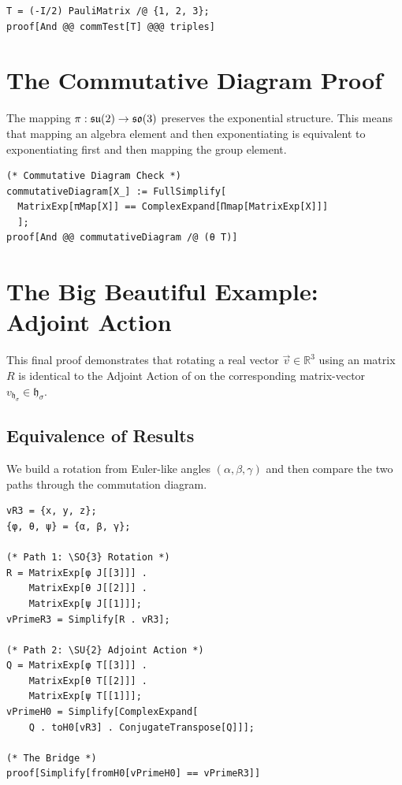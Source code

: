 \begin{Verbatim}[frame=single, label=Mathematica]
T = (-I/2) PauliMatrix /@ {1, 2, 3};
proof[And @@ commTest[T] @@@ triples] 
\end{Verbatim}

\section{The Commutative Diagram Proof}
The mapping $\pi: \mathfrak{su}(2) \to \mathfrak{so}(3)$ preserves the
exponential structure. This means that mapping an algebra element and then
exponentiating is equivalent to exponentiating first and then mapping the group
element.

\begin{Verbatim}[frame=single, label=Mathematica]
(* Commutative Diagram Check *)
commutativeDiagram[X_] := FullSimplify[
  MatrixExp[πMap[X]] == ComplexExpand[Πmap[MatrixExp[X]]]
  ];
proof[And @@ commutativeDiagram /@ (θ T)] 
\end{Verbatim}

\section{The Big Beautiful Example: Adjoint Action}
This final proof demonstrates that rotating a real vector $\vec{v} \in
\mathbb{R}^3$ using an  matrix $R$ is identical to the Adjoint Action of
 on the corresponding matrix-vector $v_{\mathfrak{h}_\sigma} \in
\mathfrak{h}_\sigma$.

\subsection{Equivalence of Results}
We build a rotation from Euler-like angles $(\alpha, \beta, \gamma)$ and
then compare the two paths through the commutation diagram.

\clearpage
\begin{Verbatim}[frame=single, label=Mathematica]
vR3 = {x, y, z};
{φ, θ, ψ} = {α, β, γ}; 

(* Path 1: \SO{3} Rotation *)
R = MatrixExp[φ J[[3]]] . 
    MatrixExp[θ J[[2]]] . 
    MatrixExp[ψ J[[1]]];
vPrimeR3 = Simplify[R . vR3];

(* Path 2: \SU{2} Adjoint Action *)
Q = MatrixExp[φ T[[3]]] . 
    MatrixExp[θ T[[2]]] . 
    MatrixExp[ψ T[[1]]];
vPrimeH0 = Simplify[ComplexExpand[
    Q . toH0[vR3] . ConjugateTranspose[Q]]];

(* The Bridge *)
proof[Simplify[fromH0[vPrimeH0] == vPrimeR3]] 
\end{Verbatim}

